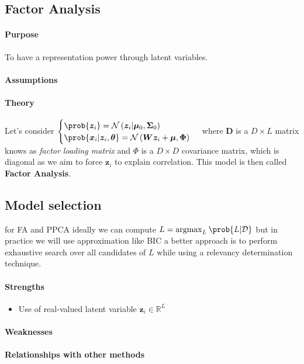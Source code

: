 \subsection{Factor Analysis}
\paragraph{Purpose}
To have a representation power through latent variables.
\paragraph{Assumptions}
\paragraph{Theory}
Let's consider 
$\begin{cases}
    \prob{\bm{z}_{i}} = \mathcal{N}\left(\bm{z}_{i}|\bm{\mu}_{0},\bm{\Sigma}_{0}
    \right) \\
    \prob{\bm{x}_{i}|\bm{z}_{i},\bm{\theta}} = \mathcal{N}\left(\bm{W}\bm{z}_{i}+
        \bm{\mu},\bm{\Phi}\right)
\end{cases}$
where $\bm{D}$ is a $D\times L$ matrix knows as \emph{factor loading matrix} and $\Phi$
is a $D\times D$ covariance matrix, which is diagonal as we aim to force $\bm{z}_{i}$
to explain correlation.
This model is then called \textbf{Factor Analysis}.
\subsection{Model selection}
for FA and PPCA ideally we can compute $L = \argmax_{L} \prob{L|\mathcal{D}}$ but
in practice we will use approximation like BIC a better approach is to perform 
exhaustive search over all candidates of $L$ while using a relevancy determination 
technique.
\paragraph{Strengths}
\begin{itemize}
    \item Use of real-valued latent variable $\bm{z}_{i}\in\mathbb{R}^{L}$
\end{itemize}
\paragraph{Weaknesses}
\paragraph{Relationships with other methods}
